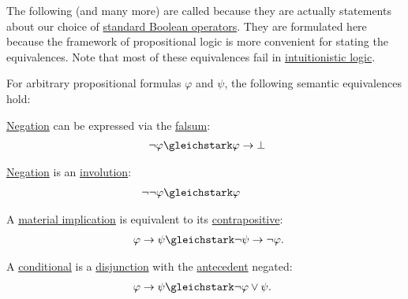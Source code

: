 \begin{proposition}\label{thm:boolean_equivalences}
  The following (and many more) are called  because they are actually statements about our choice of \hyperref[def:standard_boolean_operators]{standard Boolean operators}. They are formulated here because the framework of propositional logic is more convenient for stating the equivalences. Note that most of these equivalences fail in \hyperref[def:intuitionistic_propositional_derivation_system]{intuitionistic logic}.

  For arbitrary propositional formulas \( \varphi \) and \( \psi \), the following semantic equivalences hold:
  \begin{thmenum}
     \hyperref[def:propositional_language/negation]{Negation} can be expressed via the \hyperref[def:propositional_language/constants/falsum]{falsum}:
    \begin{equation}\label{eq:thm:boolean_equivalences/negation_bottom}
      \begin{split}
        \mathllap{\neg \varphi} &\gleichstark \mathrlap{\varphi \rightarrow \bot}.
      \end{split}
    \end{equation}

     \hyperref[def:propositional_language/negation]{Negation} is an \hyperref[def:multi_valued_function/involution]{involution}:
    \begin{equation}\label{eq:thm:boolean_equivalences/double_negation}
      \begin{split}
        \mathllap{\neg \neg \varphi} &\gleichstark \mathrlap{\varphi}.
      \end{split}
    \end{equation}

     A \hyperref[def:material_implication]{material implication} is equivalent to its \hyperref[def:material_implication/contrapositive]{contrapositive}:
    \begin{equation}\label{eq:thm:boolean_equivalences/contrapositive}
      \begin{split}
        \mathllap{\varphi \rightarrow \psi} &\gleichstark \mathrlap{\neg \psi \rightarrow \neg \varphi.}
      \end{split}
    \end{equation}

     A \hyperref[def:propositional_language/connectives/conditional]{conditional} is a \hyperref[def:propositional_language/connectives/disjunction]{disjunction} with the \hyperref[def:material_implication/antecedent]{antecedent} negated:
    \begin{equation}\label{eq:thm:boolean_equivalences/conditional_as_disjunction}
      \begin{split}
        \mathllap{\varphi \rightarrow \psi} &\gleichstark \mathrlap{ \neg \varphi \vee \psi. }
      \end{split}
    \end{equation}


\end{thmenum}
\end{proposition}
